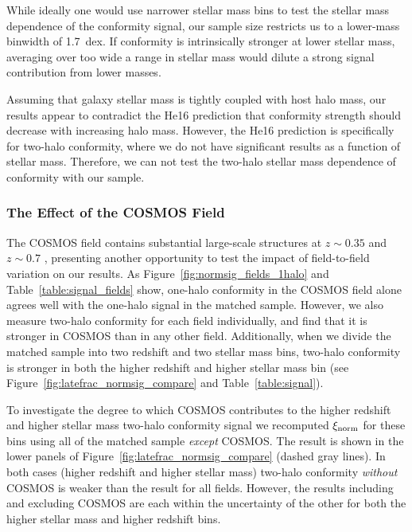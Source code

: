 While ideally one would use narrower stellar mass bins to test the stellar mass dependence of the conformity signal, our sample size restricts us to a lower-mass binwidth of 1.7~dex.
If conformity is intrinsically stronger at lower stellar mass, averaging over too wide a range in stellar mass would dilute a strong signal contribution from lower masses.

Assuming that galaxy stellar mass is tightly coupled with host halo mass, our results appear to contradict the He16 prediction that conformity strength should decrease with increasing halo mass.
However, the He16 prediction is specifically for two-halo conformity, where we do not have significant results as a function of stellar mass.
Therefore, we can not test the two-halo stellar mass dependence of conformity with our sample.

\subsubsection{The Effect of the COSMOS Field}\label{sec:cosmos}

The COSMOS field contains substantial large-scale structures at $z\sim0.35$ and $z\sim0.7$ \citep[e.g.,][]{McCracken07, Meneux09, Kovac10}, presenting another opportunity to test the impact of field-to-field variation on our results.
As Figure~\ref{fig:normsig_fields_1halo} and Table~\ref{table:signal_fields} show, one-halo conformity in the COSMOS field alone agrees well with the one-halo signal in the matched sample.
However, we also measure two-halo conformity for each field individually, and find that it is stronger in COSMOS than in any other field.
Additionally, when we divide the matched sample into two redshift and two stellar mass bins, two-halo conformity is stronger in both the higher redshift and higher stellar mass bin (see Figure~\ref{fig:latefrac_normsig_compare} and Table~\ref{table:signal}).

To investigate the degree to which COSMOS contributes to the higher redshift and higher stellar mass two-halo conformity signal we recomputed $\signorm$ for these bins using all of the matched sample \emph{except} COSMOS.
The result is shown in the lower panels of Figure~\ref{fig:latefrac_normsig_compare} (dashed gray lines).
In both cases (higher redshift and higher stellar mass) two-halo conformity \emph{without} COSMOS is weaker than the result for all fields.
However, the results including and excluding COSMOS are each within the uncertainty of the other for both the higher stellar mass and higher redshift bins.

